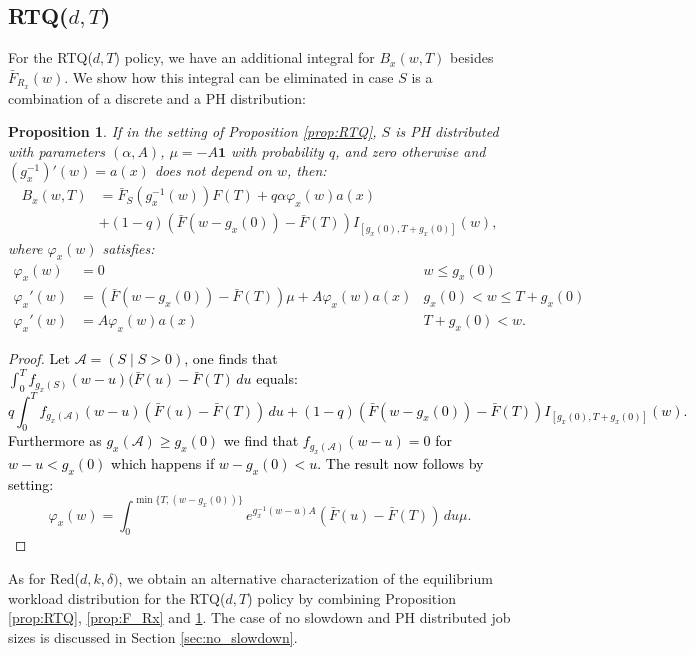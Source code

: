 \documentclass[12pt]{report}
\newtheorem{proposition}[theorem]{Proposition}
\begin{document}
\subsection{RTQ($d,T$)}
For the RTQ($d,T$) policy, we have an additional integral for $B_x(w,T)$ besides $\bar F_{R_x}(w)$. We show how this integral can be eliminated in case $S$ is a combination of a discrete and a 
PH distribution:
\begin{proposition}\label{prop:BxwT_PHD}
If in the setting of Proposition \ref{prop:RTQ}, $S$ is PH distributed with parameters $(\alpha, A)$, $\mu = -A \textbf{1}$ with probability $q$, and zero otherwise and $(g_x^{-1})'(w)=a(x)$ does not depend on $w$, then:
\begin{align*}
B_x(w,T)&= \bar F_{S}(g_x^{-1}(w)) F(T) + q \alpha \varphi_x(w) a(x)\\
& + (1-q)  (\bar F(w-g_x(0)) - \bar F(T)) I_{[g_x(0),T+g_x(0)]}(w),
\end{align*}
where $\varphi_x(w)$ satisfies:
\begin{align*}
\varphi_x(w) &= 0 & w \leq g_x(0)\\
\varphi_x'(w) &= (\bar F(w-g_x(0)) - \bar F(T)) \mu + A \varphi_x(w) a(x) & g_x(0) <w \leq T+g_x(0)\\
\varphi_x'(w) &= A \varphi_x(w) a(x) & T + g_x(0) < w.
\end{align*}
\end{proposition}
\begin{proof}
\textcolor{black}{Let $\mathcal{A}=(S \mid S>0)$, one finds that $\int_0^T f_{g_x(S)}(w-u) (\bar F(u) - \bar F(T) \, du$ equals:
$$
q\int_0^T f_{g_x(\mathcal{A})}(w-u) (\bar F(u) - \bar F(T)) \, du
+
(1-q) (\bar F(w-g_x(0)) - \bar F(T)) I_{[g_x(0),T+g_x(0)]}(w).
$$
Furthermore as $g_x(\mathcal{A}) \geq g_x(0)$ we find that $f_{g_x(\mathcal{A})}(w-u)=0$ for $w-u < g_x(0)$ which happens if $w-g_x(0) < u$. The result now follows by setting: }
$$\varphi_x(w)=\int_0^{\min\{T, (w-g_x(0))\}} e^{g_x^{-1}(w-u)A} (\bar F(u) - \bar F(T))\, du \mu .$$
\end{proof}
As for Red($d,k,\delta)$, we obtain an alternative characterization of the equilibrium workload distribution for the RTQ($d,T$) policy by combining Proposition \ref{prop:RTQ}, \ref{prop:F_Rx} and \ref{prop:BxwT_PHD}.
The case of no slowdown and PH distributed job sizes is discussed in Section \ref{sec:no_slowdown}.
\end{document}
